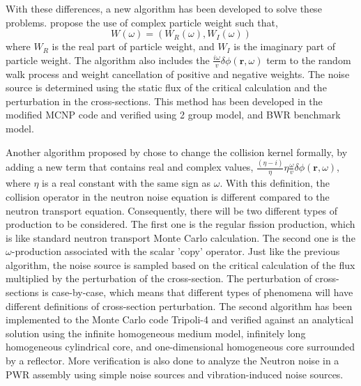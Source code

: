 With these differences, a new algorithm has been developed to solve these problems. \cite{yamamotoImplementationFrequencydomainNeutron2018} propose the use of complex particle weight such that,
\begin{equation}
    W(\omega) = (W_R (\omega), W_I (\omega))
\end{equation}
where $W_R$ is the real part of particle weight, and $W_I$ is the imaginary part of particle weight. The algorithm also includes the $ \frac{i \omega}{v} \delta \phi (\textbf{r}, \omega)$ term to the random walk process and weight cancellation of positive and negative weights. The noise source is determined using the static flux of the critical calculation and the perturbation in the cross-sections. This method has been developed in the modified MCNP code and verified using 2 group model, and BWR benchmark model.

Another algorithm proposed by \cite{rouchonNewMonteCarlo2017} chose to change the collision kernel formally, by adding a new term that contains real and complex values, $\frac{(\eta - i)}{\eta} \eta \frac{\omega}{v} \delta \phi (\textbf{r}, \omega)$, where $\eta$ is a real constant with the same sign as $\omega$. With this definition, the collision operator in the neutron noise equation is different compared to the neutron transport equation. Consequently, there will be two different types of production to be considered. The first one is the regular fission production, which is like standard neutron transport Monte Carlo calculation. The second one is the $\omega$-production associated with the scalar 'copy' operator. Just like the previous algorithm, the noise source is sampled based on the critical calculation of the flux multiplied by the perturbation of the cross-section. The perturbation of cross-sections is case-by-case, which means that different types of phenomena will have different definitions of cross-section perturbation. The second algorithm has been implemented to the Monte Carlo code Tripoli-4 \cite{rouchonNewNeutronNoise2019} and verified against an analytical solution using the infinite homogeneous medium model, infinitely long homogeneous cylindrical core, and one-dimensional homogeneous core surrounded by a reflector. More verification is also done to analyze the Neutron noise in a PWR assembly using simple noise sources and vibration-induced noise sources.

